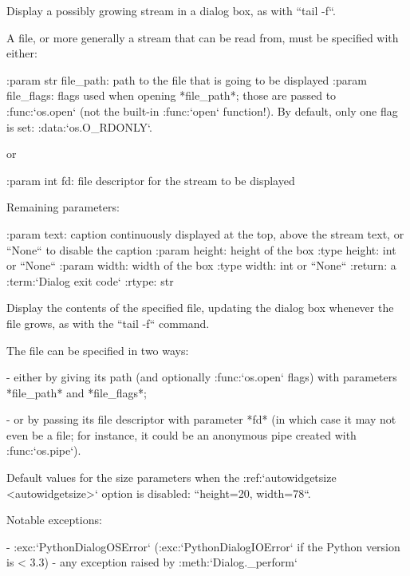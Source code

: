 \begin{DoxyVerb}Display a possibly growing stream in a dialog box, as with ``tail -f``.

A file, or more generally a stream that can be read from, must
be specified with either:

:param str file_path: path to the file that is going to be displayed
:param file_flags:
  flags used when opening *file_path*; those are passed to
  :func:`os.open` (not the built-in :func:`open` function!). By
  default, only one flag is set: :data:`os.O_RDONLY`.

or

:param int fd: file descriptor for the stream to be displayed

Remaining parameters:

:param text:   caption continuously displayed at the top, above
       the stream text, or ``None`` to disable the
       caption
:param height: height of the box
:type height:  int or ``None``
:param width:  width of the box
:type width:   int or ``None``
:return:       a :term:`Dialog exit code`
:rtype:        str

Display the contents of the specified file, updating the dialog
box whenever the file grows, as with the ``tail -f`` command.

The file can be specified in two ways:

  - either by giving its path (and optionally :func:`os.open`
    flags) with parameters *file_path* and *file_flags*;

  - or by passing its file descriptor with parameter *fd* (in
    which case it may not even be a file; for instance, it could
    be an anonymous pipe created with :func:`os.pipe`).

Default values for the size parameters when the
:ref:`autowidgetsize <autowidgetsize>` option is disabled:
``height=20, width=78``.

Notable exceptions:

  - :exc:`PythonDialogOSError` (:exc:`PythonDialogIOError` if
    the Python version is < 3.3)
  - any exception raised by :meth:`Dialog._perform`\end{DoxyVerb}
